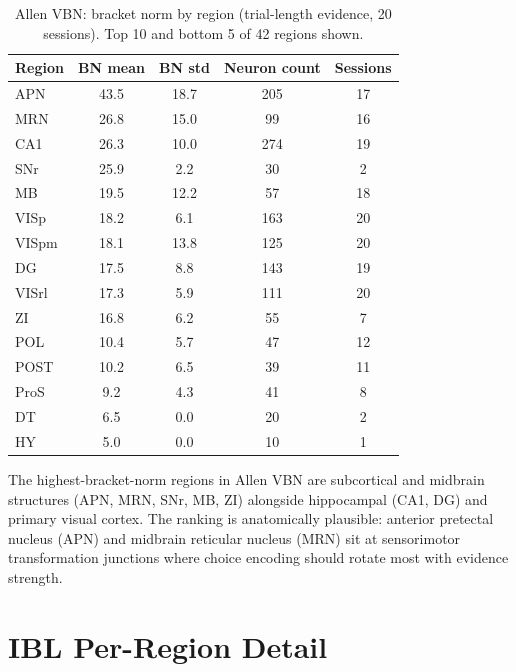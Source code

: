 \documentclass[9pt,lineno]{elife}
\begin{document}
\begin{table}[h]
\centering
\caption{Allen VBN: bracket norm by region (trial-length evidence, 20 sessions). Top 10 and bottom 5 of 42 regions shown.}
\label{tab:vbn_regions}
\small
\begin{tabular}{lcccc}
\toprule
Region & BN mean & BN std & Neuron count & Sessions \\
\midrule
APN & 43.5 & 18.7 & 205 & 17 \\
MRN & 26.8 & 15.0 & 99 & 16 \\
CA1 & 26.3 & 10.0 & 274 & 19 \\
SNr & 25.9 & 2.2 & 30 & 2 \\
MB & 19.5 & 12.2 & 57 & 18 \\
VISp & 18.2 & 6.1 & 163 & 20 \\
VISpm & 18.1 & 13.8 & 125 & 20 \\
DG & 17.5 & 8.8 & 143 & 19 \\
VISrl & 17.3 & 5.9 & 111 & 20 \\
ZI & 16.8 & 6.2 & 55 & 7 \\
\midrule
POL & 10.4 & 5.7 & 47 & 12 \\
POST & 10.2 & 6.5 & 39 & 11 \\
ProS & 9.2 & 4.3 & 41 & 8 \\
DT & 6.5 & 0.0 & 20 & 2 \\
HY & 5.0 & 0.0 & 10 & 1 \\
\bottomrule
\end{tabular}
\end{table}

The highest-bracket-norm regions in Allen VBN are subcortical and midbrain structures (APN, MRN, SNr, MB, ZI) alongside hippocampal (CA1, DG) and primary visual cortex. The ranking is anatomically plausible: anterior pretectal nucleus (APN) and midbrain reticular nucleus (MRN) sit at sensorimotor transformation junctions where choice encoding should rotate most with evidence strength.

\section{IBL Per-Region Detail}
\label{app:ibl}
\end{document}

